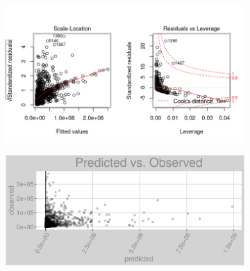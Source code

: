\begin{figure}[h]
\centering
\begin{subfigure}{1\textwidth}
\centering
\includegraphics[width=.99\textwidth, height=0.475\textheight]{Images/electricity_nn_res_2.png}
\end{subfigure}
\begin{subfigure}{1\textwidth}
\centering
\includegraphics[width=.99\textwidth, height=0.3\textheight]{Images/electricity_nn_pvo.png}
\end{subfigure}
\end{figure}
\newpage
